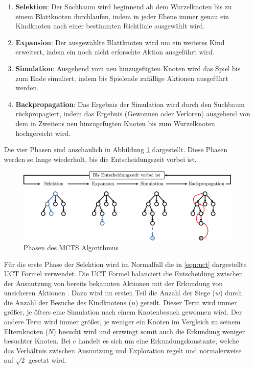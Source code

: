 \begin{enumerate}
    \item \textbf{Selektion}: Der Suchbaum wird beginnend ab dem Wurzelknoten bis zu einem Blattknoten durchlaufen, indem in jeder Ebene immer genau ein Kindknoten nach einer bestimmten Richtlinie ausgewählt wird. \cite[S. 187]{2018.ReinforcementLearning}
    \item \textbf{Expansion}: Der ausgewählte Blattknoten wird um ein weiteres Kind erweitert, indem ein noch nicht erforschte Aktion ausgeführt wird. \cite[S. 61]{2008.ParallelMCTS}
    \item \textbf{Simulation}: Ausgehend vom neu hinzugefügten Knoten wird das Spiel bis zum Ende simuliert, indem bis Spielende zufällige Aktionen ausgeführt werden. \cite[S. 61]{2008.ParallelMCTS}
    \item \textbf{Backpropagation}: Das Ergebnis der Simulation wird durch den Suchbaum rückpropagiert, indem das Ergebnis (Gewonnen oder Verloren) ausgehend von dem in Zweitens neu hinzugefügten Knoten bis zum Wurzelknoten hochgereicht wird. \cite[S. 187]{2018.ReinforcementLearning}
\end{enumerate}

Die vier Phasen sind anschaulich in Abbildung \ref{fig:mcts-phases} dargestellt. Diese Phasen werden so lange wiederholt, bis die Entscheidungszeit vorbei ist.

\begin{figure}[!ht]
    \centering
    \includegraphics[width=\textwidth]{res/pictures/mcts-phases.pdf}
    \caption{Phasen des \acs{MCTS} Algorithmus}
    \label{fig:mcts-phases}
\end{figure}

Für die erste Phase der Selektion wird im Normalfall die in \ref{eqn:uct} dargestellte \ac{UCT} Formel verwendet. Die \ac{UCT} Formel balanciert die Entscheidung zwischen der Ausnutzung von bereits bekannten Aktionen mit der Erkundung von unsicheren Aktionen \cite[S. 206]{2009.ComputerGoMCTS}. Dazu wird im ersten Teil die Anzahl der Siege ($w$) durch die Anzahl der Besuche des Kindknotens ($n$) geteilt. Dieser Term wird immer größer, je öfters eine Simulation nach einem Knotenbesuch gewonnen wird. Der andere Term wird immer größer, je weniger ein Knoten im Vergleich zu seinem Elternknoten ($N$) besucht wird und erzwingt somit auch die Erkundung weniger besuchter Knoten. Bei $c$ handelt es sich um eine Erkundungskonstante, welche das Verhältnis zwischen Ausnutzung und Exploration regelt und normalerweise auf $\sqrt{2}$ gesetzt wird.

